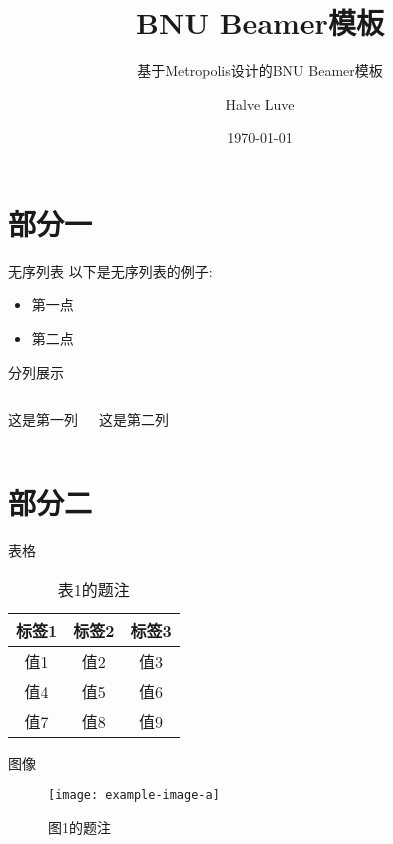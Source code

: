 \documentclass{beamer}
\title{BNU Beamer模板}
\subtitle{基于Metropolis设计的BNU Beamer模板}
\date{\today}
\author{Halve Luve}
\institute{北京师范大学人工智能学院}
\begin{document}
    \maketitle
    \tableofcontents

    \section{部分一}
    \begin{frame}{无序列表}
        以下是无序列表的例子:
        \begin{itemize}
            \item 第一点
            \item 第二点
        \end{itemize}
    \end{frame}

    \begin{frame}{分列展示}
        \begin{columns}
            这是第一列
            
            这是第二列
        \end{columns}
    \end{frame}

    \section{部分二}

    \begin{frame}{表格}
        \begin{table}
            \centering
            \begin{tabular}{ccc}
                \hline
                \textbf{标签1} & \textbf{标签2} & \textbf{标签3} \\
                \hline 
                值1 & 值2 & 值3 \\ 
                值4 & 值5 & 值6 \\ 
                值7 & 值8 & 值9 \\ 
                \hline
            \end{tabular}
            \caption{表1的题注}
            \label{tab:table1}
        \end{table}
    \end{frame}

    \begin{frame}{图像}
        \begin{figure}[H]
            \centering
            \texttt{[image: example-image-a]}
            \caption{图1的题注}
            \label{fig:figure1}
        \end{figure}
    \end{frame}
\end{document}
